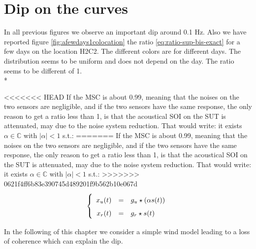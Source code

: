 \section{Dip on the curves}
In all previous figures we observe an important dip around 0.1 Hz.  Also we have reported figure \ref{fig:afewdays1colocation} the ratio \eqref{eq:ratio-sup-bis-exact} for a few days on the location H2C2. The different colors are for different days. The distribution seems to be uniform and does not depend on the day. The ratio seems to be different of 1.\\*

<<<<<<< HEAD
If the MSC is about 0.99, meaning that the noises on the two sensors are negligible, and if the two sensors have the same response, the only reason to get a ratio less than 1, is that the acoustical SOI on the SUT is attenuated, may due to the noise system reduction. That would write: it exists $\alpha\in\mathbb{C}$ with $|\alpha|<1$ s.t.:
=======
If the MSC is about 0.99, meaning that	 the noises on the two sensors are negligible, and if the two sensors have the same response, the only reason to get a ratio less than 1, is that the acoustical SOI on the SUT is attenuated, may due to the noise system reduction. That would write: it exists $\alpha\in\mathbb{C}$ with $|\alpha|<1$ s.t.:
>>>>>>> 0621f4ff6b83e390745d489201f9b562b10e067d
\begin{eqnarray}
\label{eq:model-of-obervation}
\left\{
\renewcommand\arraystretch{1.6}
\begin{array}{rcl}
x_{\ut}(t)&=&g_{\ut}  \star (\alpha s(t))
\\
x_{\rf}(t)&=&g_{\rf}  \star s(t)
\end{array}
\right.
\end{eqnarray}


In the following of this chapter we consider a simple wind model leading to a loss of coherence which can explain the dip. 

